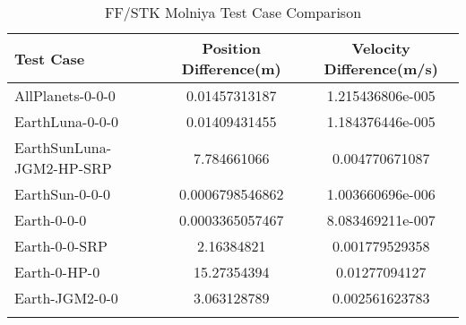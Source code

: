 \begin{table}[htbp!]
\centering
\caption{ FF/STK Molniya Test Case Comparison}
      \begin{tabular}{lcc}
      \hline\hline
          Test Case & Position Difference(m) & Velocity Difference(m/s) \\
         \hline
         AllPlanets-0-0-0 & 0.01457313187 & 1.215436806e-005 \\
         EarthLuna-0-0-0 & 0.01409431455 & 1.184376446e-005 \\
         EarthSunLuna-JGM2-HP-SRP & 7.784661066 & 0.004770671087 \\
         EarthSun-0-0-0 & 0.0006798546862 & 1.003660696e-006 \\
         Earth-0-0-0 & 0.0003365057467 & 8.083469211e-007 \\
         Earth-0-0-SRP & 2.16384821 & 0.001779529358 \\
         Earth-0-HP-0 & 15.27354394 & 0.01277094127 \\
         Earth-JGM2-0-0 & 3.063128789 & 0.002561623783 \\
      \hline\hline
      \label{Table: Molniya FF-STK Table} 
\end{tabular}
\end{table}
